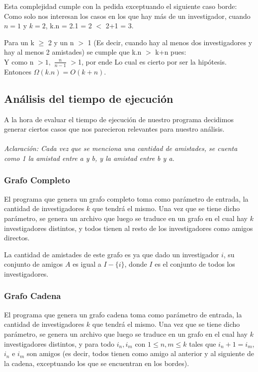 Esta complejidad cumple con la pedida exceptuando el siguiente caso borde: 
Como solo nos interesan los casos en los que hay más de un investigador, cuando 
$n = 1$ y $k = 2$, k.n = 2.1 = 2 $<$ 2+1 = 3.

\indent Para un k $\geq$ 2 y un n $>$ 1 (Es decir, cuando hay al menos dos
investigadores y hay al menos 2 amistades) se cumple que k.n $>$ k+n pues:\\
Y como n $> 1, $ $\frac{n}{n-1}$ $>$1, por ende
 Lo cual es cierto por ser la
hipótesis.
Entonces $\Omega(k.n) = O(k+n)$.\\

\subsection{Análisis del tiempo de ejecución}
A la hora de evaluar el tiempo de ejecución de nuestro programa decidimos generar ciertos casos que nos parecieron relevantes para nuestro análisis.\\
\\
\textit{Aclaración: Cada vez que se menciona una cantidad de amistades, se cuenta como 1 la amistad entre a y b, y la amistad entre b y a.}

\subsubsection{Grafo Completo}
El programa que genera un grafo completo toma como parámetro de entrada, la cantidad de investigadores $k$ que tendrá el mismo. Una vez que se tiene dicho parámetro, se genera un archivo que luego se traduce en un grafo en el cual hay $k$ investigadores distintos, y todos tienen al resto de los investigadores como amigos directos.

La cantidad de amistades de este grafo es
ya que dado un investigador $i$, su conjunto de amigos $A$ es igual a $I - \{i\}$, donde $I$ es el conjunto de todos los investigadores.

\subsubsection{Grafo Cadena}
El programa que genera un grafo cadena toma como parámetro de entrada, la cantidad de investigadores $k$ que tendrá el mismo. Una vez que se tiene dicho parámetro, se genera un archivo que luego se traduce en un grafo en el cual hay $k$ investigadores distintos, y para todo $i_n, i_m$ con $1 \leq n,m \leq k$ tales que $i_n + 1 = i_m$, $i_n$ e $i_m$ son amigos (es decir, todos tienen como amigo al anterior y al siguiente de la cadena, exceptuando los que se encuentran en los bordes).

